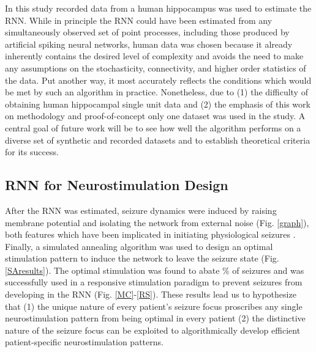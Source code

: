 \documentclass[11pt,a4paper,final]{article}
\begin{document}
In this study recorded data from a human hippocampus was used to estimate the RNN. 
While in principle the RNN could have been estimated from any simultaneously observed set of point processes, including those produced by artificial spiking neural networks, human data was chosen because it already inherently contains the desired level of complexity and avoids the need to make any assumptions on the stochasticity, connectivity, and higher order statistics of the data. 
Put another way, it most accurately reflects the conditions which would be met by such an algorithm in practice. 
Nonetheless, due to (1) the difficulty of obtaining human hippocampal single unit data and (2) the emphasis of this work on methodology and proof-of-concept only one dataset was used in the study. 
A central goal of future work will be to see how well the algorithm performs on a diverse set of synthetic and recorded datasets and to establish theoretical criteria for its success. 

\subsection{RNN for Neurostimulation Design}

After the RNN was estimated, seizure dynamics were induced by raising membrane potential and isolating the network from external noise (Fig. \ref{graph}), both features which have been implicated in initiating physiological seizures \citep{fricker99,wendling03,warren10}.
Finally, a simulated annealing algorithm was used to design an optimal stimulation pattern to induce the network to leave the seizure state (Fig. \ref{SAresults}).
The optimal stimulation was found to abate \success{}\% of seizures and was  successfully used in a responsive stimulation paradigm to prevent seizures from developing in the RNN (Fig. \ref{MC}-\ref{RS}).
These results lead us to hypothesize that (1) the unique nature of every patient's seizure focus proscribes any single neurostimulation pattern from being optimal in every patient (2) the distinctive nature of the seizure focus can be exploited to algorithmically develop efficient patient-specific neurostimulation patterns.
\end{document}
